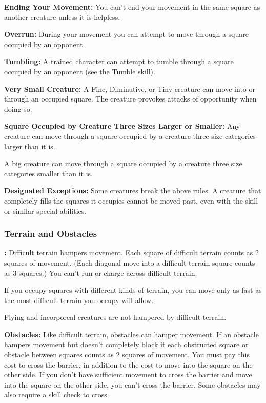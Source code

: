 \textbf{Ending Your Movement:} You can't end your movement in the same square as 
another creature unless it is helpless.

\textbf{Overrun:} During your movement you can attempt to move through a square 
occupied by an opponent.

\textbf{Tumbling:} A trained character can attempt to tumble through a square occupied 
by an opponent (see the Tumble skill).

\textbf{Very Small Creature:} A Fine, Diminutive, or Tiny creature can move into 
or through an occupied square. The creature provokes attacks of opportunity when 
doing so.

\textbf{Square Occupied by Creature Three Sizes Larger or Smaller:} Any creature 
can move through a square occupied by a creature three size categories larger than 
it is.

A big creature can move through a square occupied by a creature three size categories 
smaller than it is.

\textbf{Designated Exceptions:} Some creatures break the above rules. A creature 
that completely fills the squares it occupies cannot be moved past, even with the 
 skill or similar special abilities.

\subsubsection{Terrain and Obstacles}

\textbf{:} Difficult terrain hampers movement. Each square of 
difficult terrain counts as 2 squares of movement. (Each diagonal move into a difficult 
terrain square counts as 3 squares.) You can't run or charge across difficult terrain.

If you occupy squares with different kinds of terrain, you can move only as fast 
as the most difficult terrain you occupy will allow.

Flying and incorporeal creatures are not hampered by difficult terrain.

\textbf{Obstacles:} Like difficult terrain, obstacles can hamper movement. If an 
obstacle hampers movement but doesn't completely block it each obstructed square 
or obstacle between squares counts as 2 squares of movement. You must pay this 
cost to cross the barrier, in addition to the cost to move into the square on the 
other side. If you don't have sufficient movement to cross the barrier and move 
into the square on the other side, you can't cross the barrier. Some obstacles 
may also require a skill check to cross.

